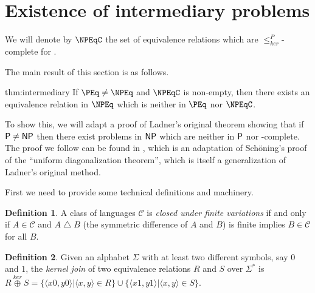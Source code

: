 \documentclass[draft]{article}
\theoremstyle{definition} \newtheorem{openproblem}[openproblem]{Open problem}
\theoremstyle{definition} \newtheorem{definition}[definition]{Definition}
\theoremstyle{remark} \newtheorem{remark}[remark]{Remark}
\newcommand{\kj}{\overset{ker}{\oplus}} %
\newcommand{\kr}{\leq^{P}_{ker}} %
\newcommand{\symdiff}{\bigtriangleup} %
\newcommand{\defn}[1]{\emph{#1}} %
\newcommand{\pair}[2]{\langle#1,#2\rangle} %
\newcommand{\printintermediarytheorem}{If $\PEq\neq\NPEq$ and $\NPEqC$ is non-empty, then there exists an equivalence relation in $\NPEq$ which is neither in $\PEq$ nor $\NPEqC$.}
\begin{document}
\section{Existence of intermediary problems}

We will denote by $\NPEqC$ the set of equivalence relations which are $\kr$-complete for \NPEq.

The main result of this section is as follows.
\begin{reptheorem}{thm:intermediary}
  \printintermediarytheorem
\end{reptheorem}
To show this, we will adapt a proof of Ladner's original theorem\cite{ladner} showing that if $\P\neq\NP$ then there exist problems in $\NP$ which are neither in $\P$ nor \NP-complete.
The proof we follow can be found in \cite{bdg95}, which is an adaptation of Sch\"{o}ning's proof of the ``uniform diagonalization theorem''\cite{schoning}, which is itself a generalization of Ladner's original method.

First we need to provide some technical definitions and machinery.

\begin{definition}
  A class of languages $\mathcal{C}$ is \defn{closed under finite variations} if and only if $A\in \mathcal{C}$ and $A\symdiff B$ (the symmetric difference of $A$ and $B$) is finite implies $B\in \mathcal{C}$ for all $B$.
\end{definition}

\begin{definition}
  Given an alphabet $\Sigma$ with at least two different symbols, say $0$ and $1$, the \defn{kernel join} of two equivalence relations $R$ and $S$ over $\Sigma^*$ is $R\kj S=\{\pair{x0}{y0}|\pair{x}{y}\in R\}\cup\{\pair{x1}{y1}|\pair{x}{y}\in S\}$.
\end{definition}
\end{document}
